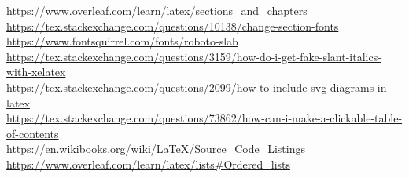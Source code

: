 \documentclass{article}
\begin{document}
    \url{https://www.overleaf.com/learn/latex/sections\_and\_chapters}\\
    \url{https://tex.stackexchange.com/questions/10138/change-section-fonts}\\
    \url{https://www.fontsquirrel.com/fonts/roboto-slab}\\
    \url{https://tex.stackexchange.com/questions/3159/how-do-i-get-fake-slant-italics-with-xelatex}\\
    \url{https://tex.stackexchange.com/questions/2099/how-to-include-svg-diagrams-in-latex}\\
    \url{https://tex.stackexchange.com/questions/73862/how-can-i-make-a-clickable-table-of-contents}\\
    \url{https://en.wikibooks.org/wiki/LaTeX/Source\_Code\_Listings}\\
    \url{https://www.overleaf.com/learn/latex/lists\#Ordered\_lists}\\
\end{document}

